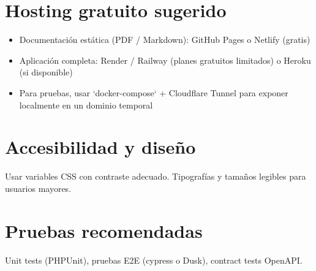 \documentclass[11pt]{article}
\begin{document}
\section{Hosting gratuito sugerido}
\begin{itemize}
  \item Documentación estática (PDF / Markdown): GitHub Pages o Netlify (gratis)
  \item Aplicación completa: Render / Railway (planes gratuitos limitados) o Heroku (si disponible)
  \item Para pruebas, usar `docker-compose` + Cloudflare Tunnel para exponer localmente en un dominio temporal
\end{itemize}

\section{Accesibilidad y diseño}
Usar variables CSS con contraste adecuado. Tipografías y tamaños legibles para usuarios mayores.

\section{Pruebas recomendadas}
Unit tests (PHPUnit), pruebas E2E (cypress o Dusk), contract tests OpenAPI.
\end{document}
